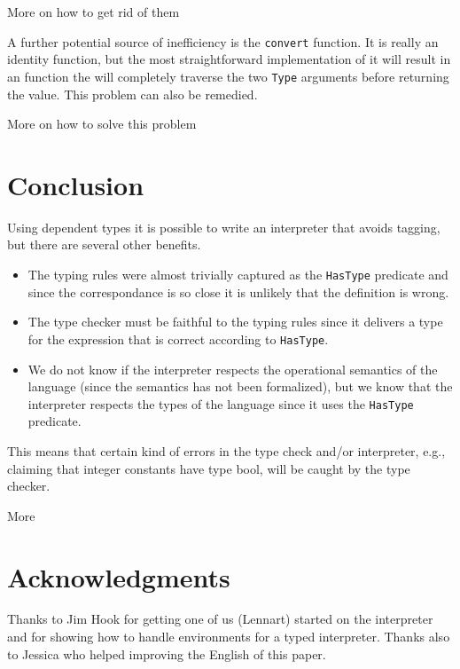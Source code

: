 \documentclass{llncs}[12pt]             %
\newcommand\tmp[1]{{\sf #1}}
\newcommand{\te}[1]{{\tt #1}}
\begin{document}
\tmp{More on how to get rid of them}

A further potential source of inefficiency is the \te{convert}
function.  It is really an identity function, but the most
straightforward implementation of it will result in an
function the will completely traverse the two \te{Type}
arguments before returning the value.  This problem can
also be remedied.

\tmp{More on how to solve this problem}

\section{Conclusion}
Using dependent types it is possible to write an interpreter that
avoids tagging, but there are several other benefits.
\begin{itemize}
\item 
The typing rules were almost trivially captured as the \te{HasType} predicate
and since the correspondance is so close it is unlikely that the definition
is wrong.
\item
The type checker must be faithful to the typing rules since it delivers
a type for the expression that is correct according to \te{HasType}.
\item
We do not know if the interpreter respects the operational semantics of
the language (since the semantics has not been formalized), but we know
that the interpreter respects the types of the language since it
uses the \te{HasType} predicate.
\end{itemize}

This means that certain kind of errors in the type check and/or interpreter,
e.g., claiming that integer constants have type bool, will be caught by
the type checker.

\tmp{More}

\section{Acknowledgments}
Thanks to Jim Hook for getting one of us (Lennart) started on the interpreter and
for showing how to handle environments for a typed interpreter.
Thanks also to Jessica who helped improving the English of this paper.


 
\end{document}
